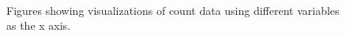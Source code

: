 \documentclass[11pt,regno]{amsart}
\theoremstyle{plain}
\numberwithin{equation}{section}
\begin{document}
\begin{figure}
\centering
\centerline{ \mbox{
\quad
{} }}
\caption{Figures showing visualizations of count data using different variables as the x axis. }
\end{figure}

\ 

\ 


\ 




 




\end{document}
